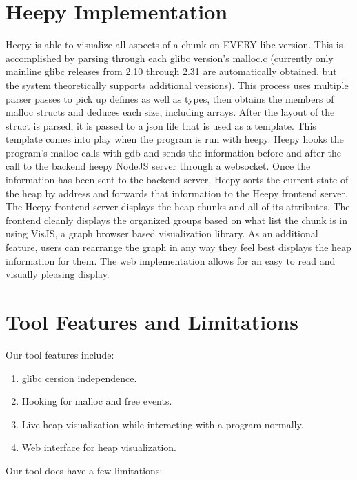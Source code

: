 \documentclass[12pt]{article}
\begin{document}
\section{Heepy Implementation}

Heepy is able to visualize all aspects of a chunk on EVERY libc version. This is accomplished by parsing through each glibc version’s malloc.c (currently only mainline glibc releases from 2.10 through 2.31 are automatically obtained, but the system theoretically supports additional versions). This process uses multiple parser passes to pick up defines as well as types, then obtains the members of malloc structs and deduces each size, including arrays. After the layout of the struct is parsed, it is passed to a json file that is used as a template. This template comes into play when the program is run with heepy. Heepy hooks the program’s malloc calls with gdb and sends the information before and after the call to the backend heepy NodeJS server through a websocket. Once the information has been sent to the backend server, Heepy sorts the current state of the heap by address and forwards that information to the Heepy frontend server. The Heepy frontend server displays the heap chunks and all of its attributes. The frontend cleanly displays the organized groups based on what list the chunk is in using VisJS, a graph browser based visualization library. As an additional feature, users can rearrange the graph in any way they feel best displays the heap information for them. The web implementation allows for an easy to read and visually pleasing display. \\

\section{Tool Features and Limitations}

Our tool features include: \\

\begin{enumerate}
    \item glibc cersion independence.
    \item Hooking for malloc and free events.
    \item Live heap visualization while interacting with a program normally.
    \item Web interface for heap visualization.
\end{enumerate}

Our tool does have a few limitations: \\
\end{document}
